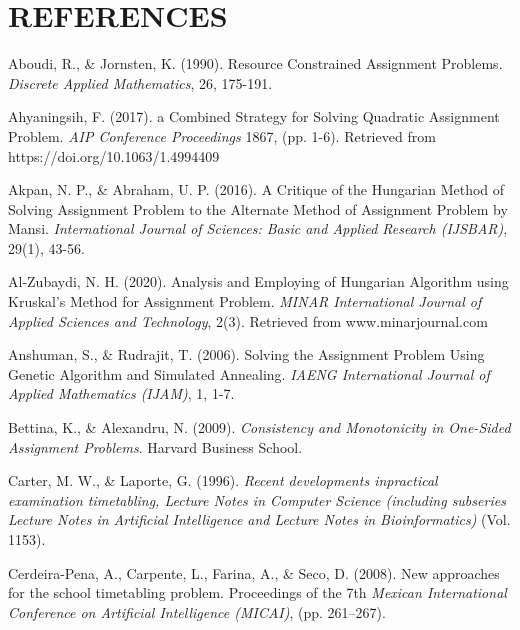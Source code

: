 \documentclass[11pt]{report}
\begin{document}
	
	\chapter*{REFERENCES}
	
	\begin{description}
		\item Aboudi, R., \& Jornsten, K. (1990). Resource Constrained Assignment Problems. \emph{Discrete Applied Mathematics}, 26, 175-191.
		
		\item Ahyaningsih, F. (2017). a Combined Strategy for Solving Quadratic Assignment Problem. \emph{AIP
		Conference Proceedings} 1867, (pp. 1-6). Retrieved from https://doi.org/10.1063/1.4994409
		
		\item Akpan, N. P., \& Abraham, U. P. (2016). A Critique of the Hungarian Method of Solving
		Assignment Problem to the Alternate Method of Assignment Problem by Mansi. \emph{International Journal of Sciences: Basic and Applied Research (IJSBAR)}, 29(1), 43-56.
		
		\item Al-Zubaydi, N. H. (2020). Analysis and Employing of Hungarian Algorithm using Kruskal's
		Method for Assignment Problem. \emph{MINAR International Journal of Applied Sciences and
		Technology}, 2(3). Retrieved from www.minarjournal.com
		
		\item Anshuman, S., \& Rudrajit, T. (2006). Solving the Assignment Problem Using Genetic Algorithm
		and Simulated Annealing. \emph{IAENG International Journal of Applied Mathematics (IJAM)}, 1, 1-7.
		
		\item Bettina, K., \& Alexandru, N. (2009). \emph{Consistency and Monotonicity in One-Sided Assignment Problems}. Harvard Business School.
		
		\item Carter, M. W., \& Laporte, G. (1996). \emph{Recent developments inpractical examination timetabling, Lecture Notes in Computer Science (including subseries Lecture Notes in Artificial
		Intelligence and Lecture Notes in Bioinformatics)} (Vol. 1153).
		
		\item Cerdeira-Pena, A., Carpente, L., Farina, A., \& Seco, D. (2008). New approaches for the school
		timetabling problem. Proceedings of the 7th \emph{Mexican International Conference on Artificial Intelligence (MICAI)}, (pp. 261–267). 
		

\end{description}
\end{document}
